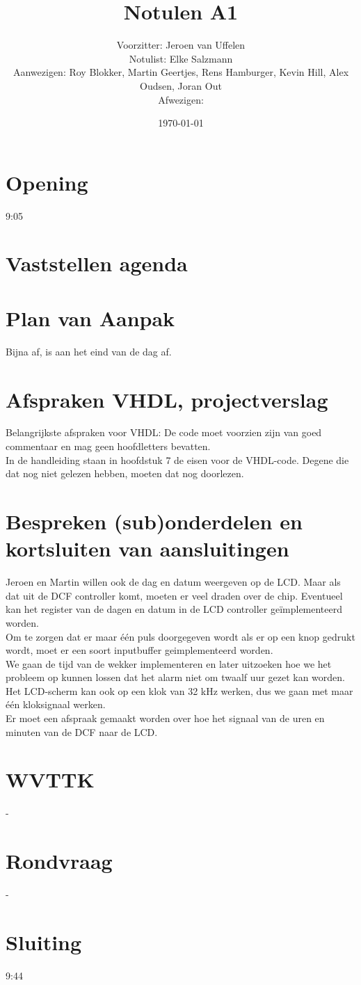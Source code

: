 \documentclass[11pt,twoside,a4paper]{article}
\title{Notulen A1}
\author{
Voorzitter: Jeroen van Uffelen\\
Notulist: Elke Salzmann\\
Aanwezigen: Roy Blokker, Martin Geertjes, Rens Hamburger, Kevin Hill, Alex Oudsen, Joran Out\\
Afwezigen: \\
}
\date{\today}
\begin{document}
\maketitle

\section{Opening}
9:05

\section{Vaststellen agenda}

\section{Plan van Aanpak}
Bijna af, is aan het eind van de dag af.

\section{Afspraken VHDL, projectverslag}
Belangrijkste afspraken voor VHDL: De code moet voorzien zijn van goed commentaar en mag geen hoofdletters bevatten.\\
In de handleiding staan in hoofdstuk 7 de eisen voor de VHDL-code. Degene die dat nog niet gelezen hebben, moeten dat nog doorlezen.

\section{Bespreken (sub)onderdelen en kortsluiten van aansluitingen}
Jeroen en Martin willen ook de dag en datum weergeven op de LCD. Maar als dat uit de DCF controller komt, moeten er veel draden over de chip. Eventueel kan het register van de dagen en datum in de LCD controller geïmplementeerd worden.\\
Om te zorgen dat er maar \'e\'en puls doorgegeven wordt als er op een knop gedrukt wordt, moet er een soort inputbuffer geimplementeerd worden.\\
We gaan de tijd van de wekker implementeren en later uitzoeken hoe we het probleem op kunnen lossen dat het alarm niet om twaalf uur gezet kan worden.\\
Het LCD-scherm kan ook op een klok van 32 kHz werken, dus we gaan met maar \'e\'en kloksignaal werken.\\
Er moet een afspraak gemaakt worden over hoe het signaal van de uren en minuten van de DCF naar de LCD.

\section{WVTTK}
-

\section{Rondvraag}
-

\section{Sluiting}
9:44
\end{document}
